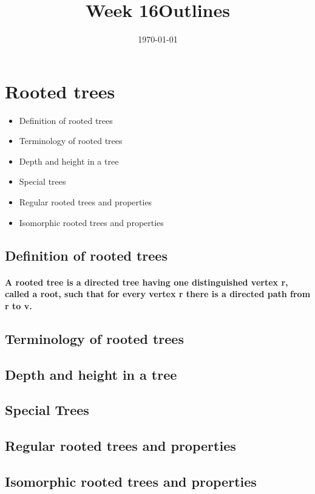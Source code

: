 \documentclass{article}
\title{Week 16}
\date{\today}
\begin{document}
\maketitle

\section{Rooted trees}

\title{Outlines}

\begin{itemize}
  \item Definition of rooted trees
  \item Terminology of rooted trees
  \item Depth and height in a tree
  \item Special trees
  \item Regular rooted trees and properties
  \item Isomorphic rooted trees and properties
\end{itemize}

\subsection{Definition of rooted trees}

\paragraph{A rooted tree is a directed tree having one distinguished vertex r, called a root, such that for every vertex r there is a directed path from r to v.}

\begin{center}
\end{center}
  

\subsection{Terminology of rooted trees}
\subsection{Depth and height in a tree}
\subsection{Special Trees}
\subsection{Regular rooted trees and properties}
\subsection{Isomorphic rooted trees and properties}
\end{document}
